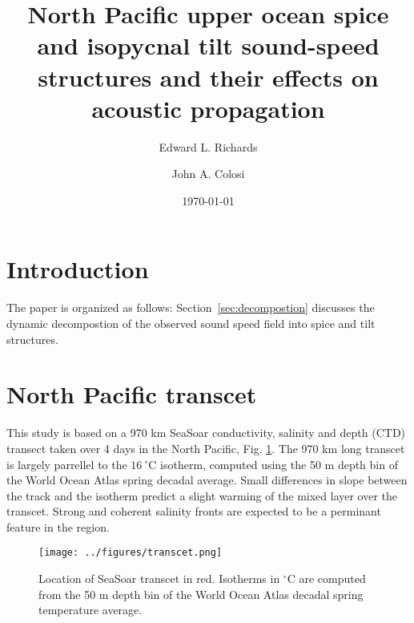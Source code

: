\documentclass[preprint,NumberedRefs]{JASA}
\begin{document}
\title[Mixed layer tilt and spice]{North Pacific upper ocean spice and isopycnal tilt sound-speed structures and their effects on acoustic propagation}
\author{Edward L. Richards}
\author{John A. Colosi}


\date{\today}


\begin{abstract}

\end{abstract}

\maketitle

\section{\label{sec:intro} Introduction}

The paper is organized as follows: Section~\ref{sec:decompostion} discusses the dynamic decompostion of the observed sound speed field into spice and tilt structures.

\section{North Pacific transcet}
This study is based on a 970 km SeaSoar conductivity, salinity and depth (CTD) transect taken over 4 days in the North Pacific\citep{cole2010seasonal}, Fig. \ref{fig:transcet}. The 970 km long transcet is largely parrellel to the $16 \ ^\circ$C isotherm, computed using the 50 m depth bin of the World Ocean Atlas spring decadal average. Small differences in slope between the track and the isotherm predict a slight warming of the mixed layer over the transcet. Strong and coherent salinity fronts are expected to be a perminant feature in the region.


\begin{figure}
\texttt{[image: ../figures/transcet.png]}
    \caption{\label{fig:transcet}{Location of SeaSoar transcet in red. Isotherms in $^\circ$C are computed from the 50 m depth bin of the World Ocean Atlas decadal spring temperature average.}}
\end{figure}
\end{document}

